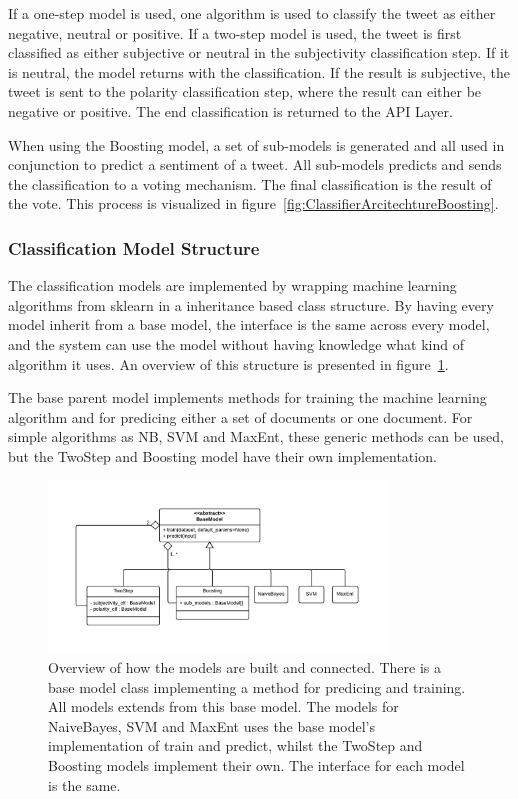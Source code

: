If a one-step model is used, one algorithm is used to classify the tweet as either negative, neutral or positive. If a two-step model is used, the tweet is first classified as either subjective or neutral in the subjectivity classification step. If it is neutral, the model returns with the classification. If the result is subjective, the tweet is sent to the polarity classification step, where the result can either be negative or positive. The end classification is returned to the API Layer.

When using the Boosting model, a set of sub-models is generated and all used in conjunction to predict a sentiment of a tweet. All sub-models predicts and sends the classification to a voting mechanism. The final classification is the result of the vote. This process is visualized in figure~\ref{fig:ClassifierArcitechtureBoosting}.

\subsubsection{Classification Model Structure}

The classification models are implemented by wrapping machine learning algorithms from sklearn in a inheritance based class structure. By having every model inherit from a base model, the interface is the same across every model, and the system can use the model without having knowledge what kind of algorithm it uses. An overview of this structure is presented in figure~\ref{fig:ModelsStructure}.

The base parent model implements methods for training the machine learning algorithm and for predicing either a set of documents or one document. For simple algorithms as NB, SVM and MaxEnt, these generic methods can be used, but the TwoStep and Boosting model have their own implementation. 
 
\begin{figure}[htb]
 \begin{center}
     \includegraphics[width=0.8\textwidth]{../img/ModelsStructure.pdf}
 \end{center}
 \caption[Classification Model Structure Overview]{Overview of how the models are built and connected. There is a base model class implementing a method for predicing and training. All models extends from this base model. The models for NaiveBayes, SVM and MaxEnt uses the base model's implementation of train and predict, whilst the TwoStep and Boosting models implement their own. The interface for each model is the same.}
 \label{fig:ModelsStructure}
\end{figure}

